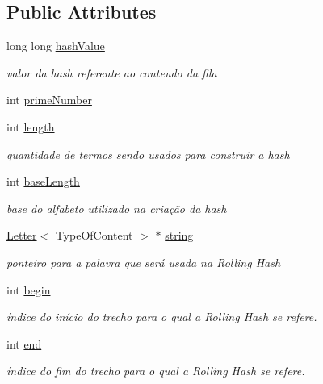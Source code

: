\subsection*{Public Attributes}
\begin{DoxyCompactItemize}
\item 
long long \hyperlink{classRollingHash_af12ead08746ce29672d41151f0d3ac21}{hash\+Value}
\begin{DoxyCompactList}\small\item\em valor da hash referente ao conteudo da fila \end{DoxyCompactList}\item 
int \hyperlink{classRollingHash_a5b021104f9f93bb2265a2046d7edaaed}{prime\+Number}
\item 
int \hyperlink{classRollingHash_ae2e7e5cffeada00e493fbd9daed2a298}{length}
\begin{DoxyCompactList}\small\item\em quantidade de termos sendo usados para construir a hash \end{DoxyCompactList}\item 
int \hyperlink{classRollingHash_aea18bfbf983b35d528fa634d5f08c810}{base\+Length}
\begin{DoxyCompactList}\small\item\em base do alfabeto utilizado na criação da hash \end{DoxyCompactList}\item 
\hyperlink{classLetter}{Letter}$<$ Type\+Of\+Content $>$ $\ast$ \hyperlink{classRollingHash_af85ff74e2d593d4bc48a9c73732d18ec}{string}
\begin{DoxyCompactList}\small\item\em ponteiro para a palavra que será usada na Rolling Hash \end{DoxyCompactList}\item 
int \hyperlink{classRollingHash_ae1516e16a6167fbe36b46af49614c6af}{begin}
\begin{DoxyCompactList}\small\item\em índice do início do trecho para o qual a Rolling Hash se refere. \end{DoxyCompactList}\item 
int \hyperlink{classRollingHash_aa3f8e695a18340a65fbe29abc46e90ff}{end}
\begin{DoxyCompactList}\small\item\em índice do fim do trecho para o qual a Rolling Hash se refere. \end{DoxyCompactList}\end{DoxyCompactItemize}


